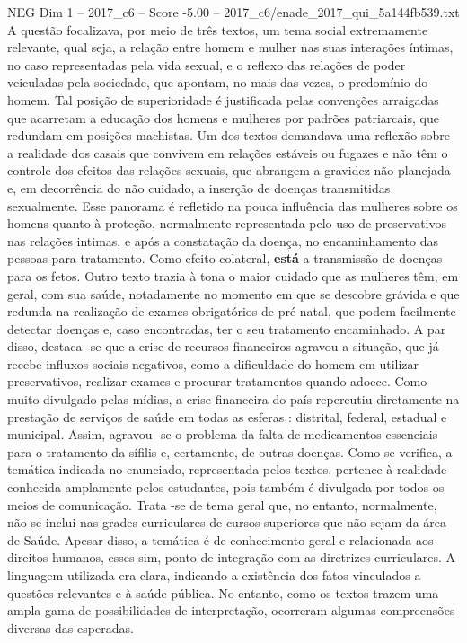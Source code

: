 \begin{textsample}{NEG Dim 1 – 2017\_c6 – Score -5.00 – 2017\_c6/enade\_2017\_qui\_5a144fb539.txt}
A questão focalizava, por meio de três textos, um tema social extremamente relevante, qual seja, a relação entre homem e mulher nas suas interações íntimas, no caso representadas pela vida sexual, e o reflexo das relações de poder veiculadas pela sociedade, que apontam, no mais das vezes, o predomínio do homem.
Tal posição de superioridade é justificada pelas convenções arraigadas que acarretam a educação dos homens e mulheres por padrões patriarcais, que redundam em posições machistas.
Um dos textos demandava uma reflexão sobre a realidade dos casais que convivem em relações estáveis ou fugazes e não têm o controle dos efeitos das relações sexuais, que abrangem a gravidez não planejada e, em decorrência do não cuidado, a inserção de doenças transmitidas sexualmente.
Esse panorama é refletido na pouca influência das mulheres sobre os homens quanto à proteção, normalmente representada pelo uso de preservativos nas relações intimas, e após a constatação da doença, no encaminhamento das pessoas para tratamento.
Como efeito colateral, \textbf{está} a transmissão de doenças para os fetos.
Outro texto trazia à tona o maior cuidado que as mulheres têm, em geral, com sua saúde, notadamente no momento em que se descobre grávida e que redunda na realização de exames obrigatórios de pré-natal, que podem facilmente detectar doenças e, caso encontradas, ter o seu tratamento encaminhado.
A par disso, destaca -se que a crise de recursos financeiros agravou a situação, que já recebe influxos sociais negativos, como a dificuldade do homem em utilizar preservativos, realizar exames e procurar tratamentos quando adoece.
Como muito divulgado pelas mídias, a crise financeira do país repercutiu diretamente na prestação de serviços de saúde em todas as esferas : distrital, federal, estadual e municipal.
Assim, agravou -se o problema da falta de medicamentos essenciais para o tratamento da sífilis e, certamente, de outras doenças.
Como se verifica, a temática indicada no enunciado, representada pelos textos, pertence à realidade conhecida amplamente pelos estudantes, pois também é divulgada por todos os meios de comunicação.
Trata -se de tema geral que, no entanto, normalmente, não se inclui nas grades curriculares de cursos superiores que não sejam da área de Saúde.
Apesar disso, a temática é de conhecimento geral e relacionada aos direitos humanos, esses sim, ponto de integração com as diretrizes curriculares.
A linguagem utilizada era clara, indicando a existência dos fatos vinculados a questões relevantes e à saúde pública.
No entanto, como os textos trazem uma ampla gama de possibilidades de interpretação, ocorreram algumas compreensões diversas das esperadas.

\end{textsample}
